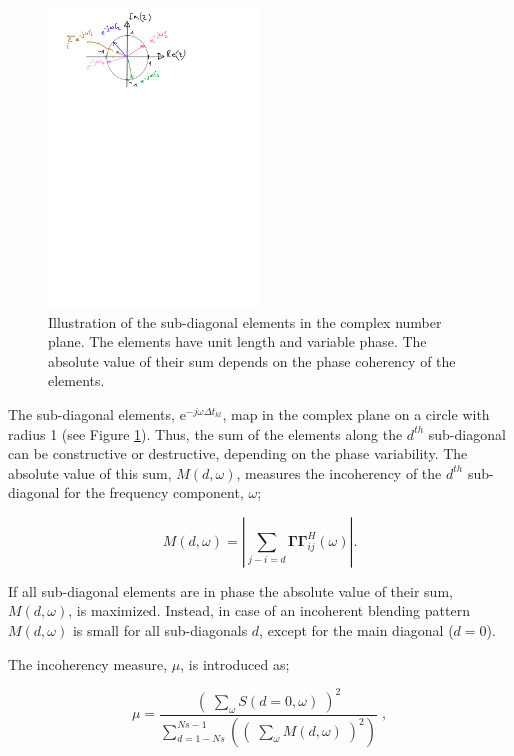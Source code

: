 \begin{figure}
	\centering
	\includegraphics[width = 0.5\textwidth]{Plots/complex-circle}
	\caption{Illustration of the sub-diagonal elements in the complex number plane. The elements have unit length and variable phase. The absolute value of their sum depends on the phase coherency of the elements.}
	\label{fig:Ch-Results-complex-circle}
\end{figure}

The sub-diagonal elements, $\mathrm{e}^{-j \omega \Delta t_{kl}}$, map in the complex plane on a circle with radius 1 (see Figure \ref{fig:Ch-Results-complex-circle}). Thus, the sum of the elements along the $d^{th}$ sub-diagonal can be constructive or destructive, depending on the phase variability. The absolute value of this sum, $M(d,\omega)$, measures the incoherency of the $d^{th}$ sub-diagonal for the frequency component, $\omega$;

\begin{equation}
	M(d,\omega) = \left| \sum_{j-i=d} \mathbf{\Gamma \Gamma}^H_{ij} (\omega) \right|.
	\label{eq:Ch-Results-incoherency-diagsum}	
\end{equation} 

If all sub-diagonal elements are in phase the absolute value of their sum, $M(d,\omega)$, is maximized. Instead, in case of an incoherent blending pattern $M(d,\omega)$ is small for all sub-diagonals $d$, except for the main diagonal ($d = 0$).  

The incoherency measure, $\mu$, is introduced as;

\begin{equation}
	\mu = \frac{\left( \; \sum_{\omega}S(d=0,\omega) \; \right)^2}{\sum_{d = 1-Ns}^{Ns-1} \left(\left( \; \sum_{\omega}M(d,\omega) \; \right)^2\right)} \; ,
	\label{eq:Ch-Results-incoherency}
\end{equation}

